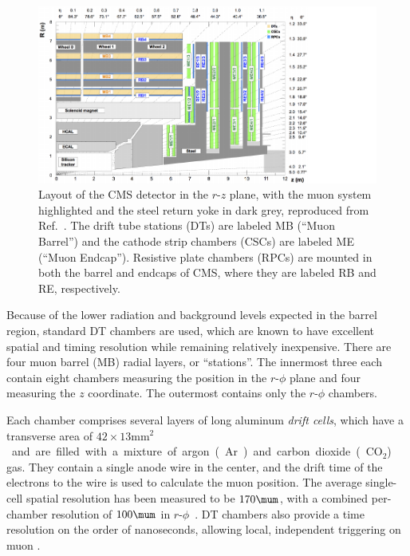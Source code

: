 \begin{figure}[ht]
    \centering
    \includegraphics[trim=0pt 0pt 90pt 0pt, width=\textwidth]{figures/02-CMS/cms/components/muon_system}
    \caption[Layout of the CMS detector in the $r$-$z$ plane, with the muon system highlighted and the steel return yoke in dark grey, reproduced from Ref.~\cite{CMS:2018rym}.]{Layout of the CMS detector in the $r$-$z$ plane, with the muon system highlighted and the steel return yoke in dark grey, reproduced from Ref.~\cite{CMS:2018rym}.
    The drift tube stations (DTs) are labeled MB (“Muon Barrel”) and the cathode strip chambers (CSCs) are labeled ME (“Muon Endcap”).
    Resistive plate chambers (RPCs) are mounted in both the barrel and endcaps of CMS, where they are labeled RB and RE, respectively.
    }
    \label{fig:02_cms_muon}
\end{figure}

Because of the lower radiation and background levels expected in the barrel region, standard DT chambers are used, which are known to have excellent spatial and timing resolution while remaining relatively inexpensive.
There are four muon barrel (MB) radial layers, or ``stations''.
The innermost three each contain eight chambers measuring the position in the $r$-$\phi$ plane and four measuring the $z$ coordinate.
The outermost contains only the $r$-$\phi$ chambers.

Each chamber comprises several layers of long aluminum \textit{drift cells}, which have a transverse area of $42\times13$\unit{mm$^2$} and are filled with a mixture of argon (Ar) and carbon dioxide (CO$_2$) gas.
They contain a single anode wire in the center, and the drift time of the electrons to the wire is used to calculate the muon position.
The average single-cell spatial resolution has been measured to be $170\mum$, with a combined per-chamber resolution of $100\mum$ in $r$-$\phi$~\cite{CMS:2008xjf}.
DT chambers also provide a time resolution on the order of nanoseconds, allowing local, independent triggering on muon \pt.

